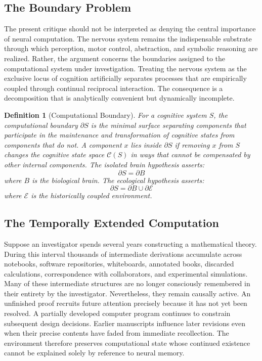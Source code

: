 \documentclass[12pt,oneside]{article}
\newtheorem{definition}{Definition}[section]
\theoremstyle{remark}
\begin{document}
\subsection{The Boundary Problem}

The present critique should not be interpreted as denying the central importance of neural computation. The nervous system remains the indispensable substrate through which perception, motor control, abstraction, and symbolic reasoning are realized. Rather, the argument concerns the boundaries assigned to the computational system under investigation. Treating the nervous system as the exclusive locus of cognition artificially separates processes that are empirically coupled through continual reciprocal interaction. The consequence is a decomposition that is analytically convenient but dynamically incomplete.

\begin{definition}[Computational Boundary]
For a cognitive system \(S\), the computational boundary \(\partial S\) is the minimal surface separating components that participate in the maintenance and transformation of cognitive states from components that do not. A component \(x\) lies inside \(\partial S\) if removing \(x\) from \(S\) changes the cognitive state space \(\mathcal{C}(S)\) in ways that cannot be compensated by other internal components. The isolated brain hypothesis asserts:
\[
\partial S = \partial B
\]
where \(B\) is the biological brain. The ecological hypothesis asserts:
\[
\partial S = \partial B \cup \partial \mathcal{E}
\]
where \(\mathcal{E}\) is the historically coupled environment.
\end{definition}

\subsection{The Temporally Extended Computation}

Suppose an investigator spends several years constructing a mathematical theory. During this interval thousands of intermediate derivations accumulate across notebooks, software repositories, whiteboards, annotated books, discarded calculations, correspondence with collaborators, and experimental simulations. Many of these intermediate structures are no longer consciously remembered in their entirety by the investigator. Nevertheless, they remain causally active. An unfinished proof recruits future attention precisely because it has not yet been resolved. A partially developed computer program continues to constrain subsequent design decisions. Earlier manuscripts influence later revisions even when their precise contents have faded from immediate recollection. The environment therefore preserves computational state whose continued existence cannot be explained solely by reference to neural memory.
\end{document}
